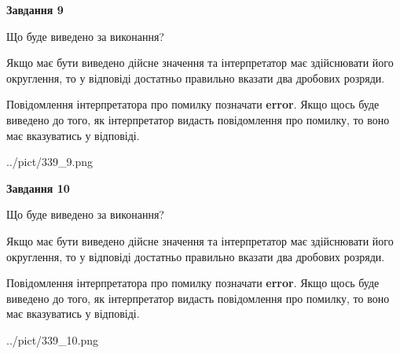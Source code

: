 \documentclass[12pt, ukrainian]{article}
\begin{document}
{\begin {Large}
{\begin {center}\textbf{Завдання 9}\end {center}}\par
Що буде виведено за виконання? \par

Якщо має бути виведено дійсне значення та інтерпретатор має здійснювати його округлення, 
то у відповіді достатньо правильно вказати два дробових розряди.

Повідомлення інтерпретатора про помилку позначати \textbf{error}.
Якщо щось буде виведено до того, як інтерпретатор видасть повідомлення про помилку, 
то воно має вказуватись у відповіді. \par

\begin{center}
	{../pict/339_9.png}
\end{center}
\newpage

{\begin {center}\textbf{Завдання 10}\end {center}}\par
Що буде виведено за виконання? \par

Якщо має бути виведено дійсне значення та інтерпретатор має здійснювати його округлення, 
то у відповіді достатньо правильно вказати два дробових розряди.

Повідомлення інтерпретатора про помилку позначати \textbf{error}.
Якщо щось буде виведено до того, як інтерпретатор видасть повідомлення про помилку, 
то воно має вказуватись у відповіді. \par

\begin{center}
	{../pict/339_10.png}
\end{center}
\newpage

\end {Large}}
\end{document}
